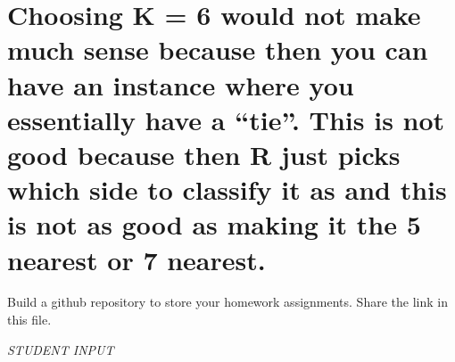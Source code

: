 \documentclass[
]{article}
\begin{document}
\hypertarget{choosing-k-6-would-not-make-much-sense-because-then-you-can-have-an-instance-where-you-essentially-have-a-tie.-this-is-not-good-because-then-r-just-picks-which-side-to-classify-it-as-and-this-is-not-as-good-as-making-it-the-5-nearest-or-7-nearest.}{%
\section{Choosing K = 6 would not make much sense because then you can
have an instance where you essentially have a ``tie''. This is not good
because then R just picks which side to classify it as and this is not
as good as making it the 5 nearest or 7
nearest.}\label{choosing-k-6-would-not-make-much-sense-because-then-you-can-have-an-instance-where-you-essentially-have-a-tie.-this-is-not-good-because-then-r-just-picks-which-side-to-classify-it-as-and-this-is-not-as-good-as-making-it-the-5-nearest-or-7-nearest.}}

Build a github repository to store your homework assignments. Share the
link in this file.

\emph{STUDENT INPUT}
\end{document}
